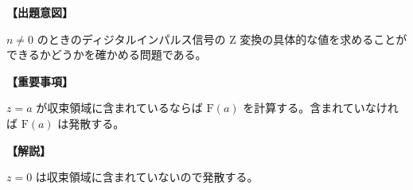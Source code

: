 \noindent \textbf{【出題意図】}

\bigskip
\noindent $n \ne 0 $ のときのディジタルインパルス信号の Z 変換の具体的な値を求めることができるかどうかを確かめる問題である。

\vspace{1em}
\noindent \textbf{【重要事項】}

\medskip
$z = a$ が収束領域に含まれているならば $\textrm{F}(a)$ を計算する。含まれていなければ $\textrm{F}(a)$ は発散する。

\bigskip

\vspace{1em}
\noindent \textbf{【解説】}

\bigskip
\noindent $z = 0$ は収束領域に含まれていないので発散する。
